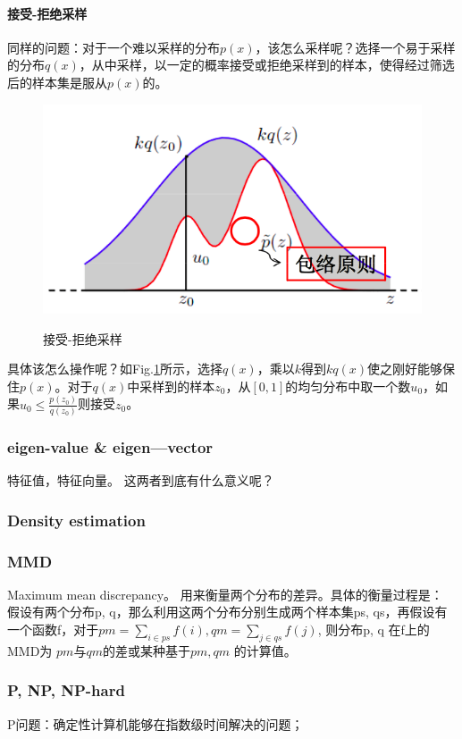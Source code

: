 \paragraph{接受-拒绝采样}
同样的问题：对于一个难以采样的分布$p(x)$，该怎么采样呢？选择一个易于采样的分布$q(x)$，从中采样，以一定的概率接受或拒绝采样到的样本，使得经过筛选后的样本集是服从$p(x)$的。
\begin{figure}[h]
	\centering
	\includegraphics[width=.6\textwidth]{pics/accept-reject-sample.png}
	\label{fig:accept-reject-sample}
	\caption{接受-拒绝采样}
\end{figure}
具体该怎么操作呢？如Fig.\ref{fig:accept-reject-sample}所示，选择$q(x)$，乘以$k$得到$kq(x)$使之刚好能够保住$p(x)$。对于$q(x)$中采样到的样本$z_0$，从$[0, 1]$的均匀分布中取一个数$u_0$，如果$u_0 \le \frac{p(z_0)}{q(z_0)}$则接受$z_0$。

\subsubsection{eigen-value \& eigen—vector }
特征值，特征向量。
这两者到底有什么意义呢？


\subsubsection{Density estimation }

\subsubsection{MMD}
Maximum mean discrepancy。 用来衡量两个分布的差异。具体的衡量过程是：
假设有两个分布p, q，那么利用这两个分布分别生成两个样本集ps, qs，再假设有一个函数f，对于$pm = \sum_{i \in ps}f(i), qm = \sum_{j \in qs}f(j) $,
则分布p, q 在f上的MMD为 $pm$与$qm$的差或某种基于$pm, qm$ 的计算值。

\subsubsection{P, NP, NP-hard}
P问题：确定性计算机能够在指数级时间解决的问题；

